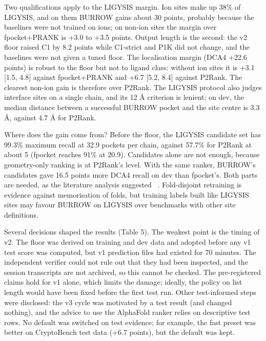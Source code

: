 \documentclass[10pt,letterpaper]{article}
\begin{document}
Two qualifications apply to the LIGYSIS margin. Ion sites make up 38\% of LIGYSIS, and on them BURROW gains about 30 points, probably because the baselines were not trained on ions; on non-ion sites the margin over fpocket+PRANK is +3.0 to +3.5 points. Output length is the second: the v2 floor raised C1 by 8.2 points while C1-strict and P1K did not change, and the baselines were not given a tuned floor. The localisation margin (DCA4 +22.6 points) is robust to the floor but not to ligand class: without ion sites it is +3.1 [1.5, 4.8] against fpocket+PRANK and +6.7 [5.2, 8.4] against P2Rank. The clearest non-ion gain is therefore over P2Rank. The LIGYSIS protocol also judges interface sites on a single chain, and its 12 \AA{} criterion is lenient; on dev, the median distance between a successful BURROW pocket and the site centre is 3.3 \AA{}, against 4.7 \AA{} for P2Rank.

Where does the gain come from? Before the floor, the LIGYSIS candidate set has 99.3\% maximum recall at 32.9 pockets per chain, against 57.7\% for P2Rank at about 5 (fpocket reaches 91\% at 20.9). Candidates alone are not enough, because geometry-only ranking is at P2Rank's level. With the same ranker, BURROW's candidates gave 16.5 points more DCA4 recall on dev than fpocket's. Both parts are needed, as the literature analysis suggested ~\cite{utges2024}. Fold-disjoint retraining is evidence against memorisation of folds, but training labels built like LIGYSIS sites may favour BURROW on LIGYSIS over benchmarks with other site definitions.

Several decisions shaped the results (Table 5). The weakest point is the timing of v2. The floor was derived on training and dev data and adopted before any v1 test score was computed, but v1 prediction files had existed for 70 minutes. The independent verifier could not rule out that they had been inspected, and the session transcripts are not archived, so this cannot be checked. The pre-registered claims hold for v1 alone, which limits the damage; ideally, the policy on list length would have been fixed before the first test run. Other test-informed steps were disclosed: the v3 cycle was motivated by a test result (and changed nothing), and the advice to use the AlphaFold ranker relies on descriptive test rows. No default was switched on test evidence; for example, the fast preset was better on CryptoBench test data (+6.7 points), but the default was kept.
\end{document}
